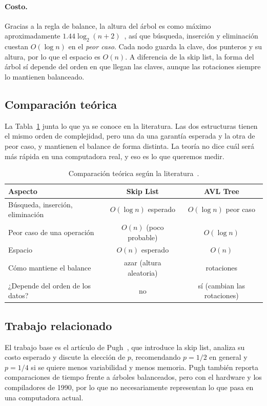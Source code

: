 \documentclass[11pt,a4paper]{article}
\begin{document}
\paragraph{Costo.}
Gracias a la regla de balance, la altura del árbol es como máximo
aproximadamente $1.44 \log_2(n+2)$~\cite{knuth1998}, así que búsqueda,
inserción y eliminación cuestan $O(\log n)$ en el \emph{peor caso}. Cada nodo
guarda la clave, dos punteros y su altura, por lo que el espacio es $O(n)$. A
diferencia de la skip list, la forma del árbol sí depende del orden en que
llegan las claves, aunque las rotaciones siempre lo mantienen balanceado.

\subsection{Comparación teórica}

La Tabla~\ref{tab:teoria} junta lo que ya se conoce en la literatura. Las dos
estructuras tienen el mismo orden de complejidad, pero una da una garantía
esperada y la otra de peor caso, y mantienen el balance de forma distinta.
La teoría no dice cuál será más rápida en una computadora real, y eso es lo
que queremos medir.

\begin{table}[!htb]
\centering
\begin{tabular}{lcc}
\toprule
\textbf{Aspecto} & \textbf{Skip List} & \textbf{AVL Tree} \\
\midrule
Búsqueda, inserción, eliminación & $O(\log n)$ esperado & $O(\log n)$ peor caso \\
Peor caso de una operación       & $O(n)$ (poco probable) & $O(\log n)$ \\
Espacio                          & $O(n)$ esperado & $O(n)$ \\
Cómo mantiene el balance         & azar (altura aleatoria) & rotaciones \\
¿Depende del orden de los datos? & no & sí (cambian las rotaciones) \\
\bottomrule
\end{tabular}
\caption{Comparación teórica según la literatura~\cite{pugh1990,knuth1998}.}
\label{tab:teoria}
\end{table}

\subsection{Trabajo relacionado}

El trabajo base es el artículo de Pugh~\cite{pugh1990}, que introduce la skip
list, analiza su costo esperado y discute la elección de $p$, recomendando
$p = 1/2$ en general y $p = 1/4$ si se quiere menos variabilidad y menos
memoria. Pugh también reporta comparaciones de tiempo frente a árboles
balanceados, pero con el hardware y los compiladores de 1990, por lo que no
necesariamente representan lo que pasa en una computadora actual.
\end{document}
